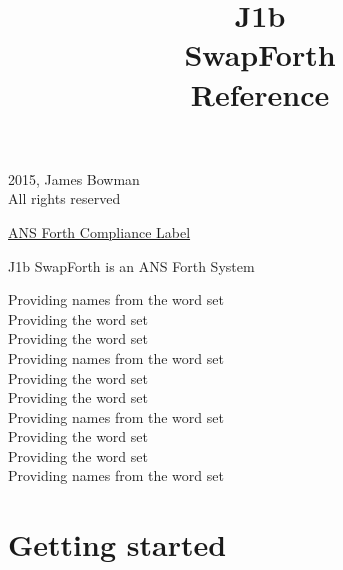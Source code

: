 %
%



\title{\LARGE \bf
J1b\\
SwapForth \\
Reference
}



\maketitle

\begingroup
\footnotesize
\parindent 0pt
\parskip \baselineskip
\textcopyright{} 2015, James Bowman \\
All rights reserved

\begin{framed}

\underline{ANS Forth Compliance Label}

J1b SwapForth is an ANS Forth System

Providing names from the  word set \\
Providing the  word set \\
Providing the  word set \\
Providing names from the  word set \\
Providing the  word set \\
Providing the  word set \\
Providing names from the  word set \\
Providing the  word set \\
Providing the  word set \\
Providing names from the  word set

\end{framed}

\endgroup

\thispagestyle{empty}
\pagestyle{headings}

\tableofcontents

\chapter{Getting started}


